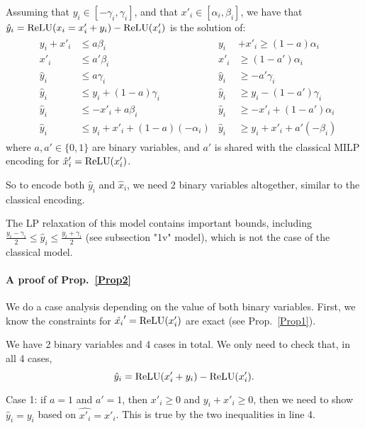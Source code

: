 \begin{proposition}
    \label{Prop2}
Assuming that $y_i \in [-\gamma_i, \gamma_i]$,
and that $x'_i \in [\alpha_i,\beta_i]$,
we have that $\hat{y}_i = \mathrm{ReLU}(x_i=x'_i+y_i)-\mathrm{ReLU}(x'_i)$ is the solution of:
	\begin{align*}
		& \begin{aligned}
			y_i + x'_i &\leq a\beta_i        &
			y_i &+ x'_i \geq (1-a)\alpha_i \\
			x'_i       &\leq a'\beta_i       & 
			x'_i       &\geq (1-a')\alpha_i \\
			\hat{y}_i  &\leq a\gamma_i       &
			\hat{y}_i  &\geq -a'\gamma_i \\
			\hat{y}_i  &\leq y_i + (1-a)\gamma_i  &
			\hat{y}_i  &\geq y_i - (1-a')\gamma_i \\
			\hat{y}_i  &\leq -x'_i + a\beta_i &
			\hat{y}_i  &\geq -x'_i + (1-a')\alpha_i \\
			\hat{y}_i  &\leq y_i + x'_i + (1-a)(-\alpha_i) &
			\hat{y}_i  &\geq y_i + x'_i + a'(-\beta_i)
		\end{aligned}
	\end{align*} 
    where $a,a' \in \{0,1\}$ are binary variables, 
    and $a'$ is shared with the classical MILP
    encoding for $\hat{x}'_i=\mathrm{ReLU}(x'_i)$.
\end{proposition}

So to encode both $\hat{y}_i$ and $\hat{x}_i$, we need 2 binary variables altogether, similar to the classical encoding.

The LP relaxation of this model contains important bounds, including 
    $\frac{y_i-\gamma_i}{2} \leq \hat{y}_i \leq \frac{y_i+\gamma_i}{2}$
    (see subsection "1v" model), which is not the case of the classical model.
	

\paragraph{A proof of Prop.~\ref{Prop2}}

We do a case analysis depending on the value of both binary variables. 
First, we know the constraints for $\hat{x_i}'=\mathrm{ReLU}(x_i')$ are exact (see 
Prop.~\ref{Prop1}). 

We have 2 binary variables and 4 cases in total. We only need to check that, in all 4 cases, $$\hat{y}_i = \mathrm{ReLU}(x'_i+y_i)-\mathrm{ReLU}(x'_i).$$

Case 1: if $a = 1$ and $a' = 1$, then $x'_i \geq 0 $ and $y_i+x'_i\geq 0$, then we need to show $\hat{y}_i = y_i$ based on  $\hat{x'_i} = x'_i$. This is true by the two inequalities in line 4.

